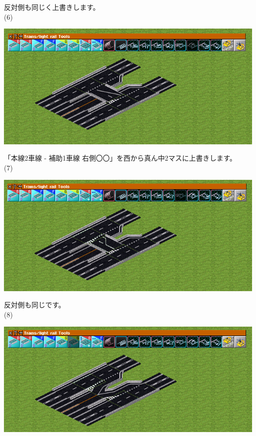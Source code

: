 \documentclass{jbook}
\begin{document}
  反対側も同じく上書きします。
  \\

  (6)

  \includegraphics[width = 135mm]{picture/20210214-road-1-7.png}

  「本線2車線 - 補助1車線 右側〇〇」を西から真ん中2マスに上書きします。
  \\

  (7)

  \includegraphics[width = 135mm]{picture/20210214-road-1-8.png}

  反対側も同じです。
  \\

\newpage
  (8)

  \includegraphics[width = 135mm]{picture/20210214-road-1-9.png}
\end{document}
